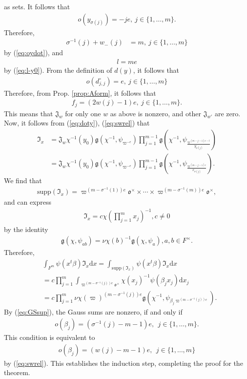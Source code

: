 \documentclass[11pt]{amsart}
\newcommand\s{\sigma}%
\newcommand\Vp{\varpi}%
\newcommand\vp{\varphi}%
\newcommand\oo{\mathfrak{o}}
\newcommand\If{\mathfrak{I}}
\newcommand\Jf{\mathfrak{J}}
\newcommand\gf{\mathfrak{g}}
\newcommand\dr{\mathrm{d}}
\newcommand\1{\mathbf{1}}
\newcommand\tm{\times}
\newcommand\supp{{\mathrm{supp}}}%
\numberwithin{equation}{section}
\begin{document}
as sets.
It follows that 
\begin{align*}
o(y_{\s(j)}) = -je, \ j \in \{1, \ldots, m\}.
\end{align*} 
Therefore,  
\begin{align}
\s^{-1}(j) + w_-(j) &= m, \ j \in \{1,\ldots, m\} \label{eq:swrel}
\end{align} 
by (\ref{eq:oydot}), and 
\begin{align*}
l = me
\end{align*} 
by (\ref{eq:l-y0}).
From the definition of $d(y)$, it follows that 
\begin{align*}
o(d_{j,j}^\circ) = e, \ j \in \{1,\ldots, m\}
\end{align*} 
Therefore, from Prop. \ref{prop:Aform}, it follows that  
\begin{align*}
f_j = (2w(j)-1)e, \ j \in \{1,\ldots, m\}.
\end{align*} 
This means that $\Jf_{w}$ for only one $w$ as above is nonzero, and other $\Jf_{w'}$ are zero.
Now, it follows from (\ref{eq:doty}), (\ref{eq:swrel}) that 
\begin{align*} 
\If_x &= \Jf_{w} \chi^{-1}(y_{0}) \gf(\chi^{-1}, \psi_{\Vp^{-e}}) \prod_{j=1}^{m-1} \gf\left(\chi^{-1}, \psi_{\frac{\Vp^{(m-j-1)e-l}}{y_{\s(j)}}}\right) \\
&= \Jf_{w} \chi^{-1}(y_{0}) \gf(\chi^{-1}, \psi_{\Vp^{-e}}) \prod_{j=1}^{m-1} \gf\left(\chi^{-1}, \psi_{\frac{\Vp^{(m-j-1)e}}{x_{\s(j)}}}\right).
\end{align*} 
We find that
\begin{align*}
\supp(\If_x) = \Vp^{(m-\s^{-1}(1))e} \oo^\tm \tm \cdots \tm \Vp^{(m-\s^{-1}(m))e} \oo^\tm,
\end{align*} 
and can express 
\begin{align*}
\If_x = c \chi(\prod_{j=1}^m x_j)^{-1}, c \neq 0 
\end{align*} 
by the identity
\begin{align}
\gf(\chi,\psi_{ab}) = \nu\chi(b)^{-1} \gf(\chi,\psi_{a}) ,a,b \in F^\tm. \label{eq:GSprop}
\end{align}
Therefore,  
\begin{align*}
& \int_{F^{m}} \psi(x {}^t\beta) \If_x \dr x = \int_{\supp(\If_x)} \psi(x {}^t\beta) \If_x \dr x \\
&= c\prod_{j=1}^m \int_{\Vp^{(m-\s^{-1}(j))e} \oo^\tm} \chi(x_j)^{-1} \psi(\beta_j x_j) \dr x_j \\
&= c \prod_{j =1}^m \nu\chi(\Vp)^{(m-\s^{-1}(j))e} \gf\left(\chi^{-1}, \psi_{\beta_j \Vp^{(m -\s^{-1}(j))e}}\right).
\end{align*} 
By (\ref{eq:GSsup}), the Gauss sums are nonzero, if and only if 
\begin{align*}
o(\beta_j) = (\s^{-1}(j) -m-1)e, \ \ j \in \{1,\ldots, m\}.
\end{align*} 
This condition is equivalent to 
\begin{align*}
o(\beta_j) = (w(j) -m-1)e, \ \ j \in \{1,\ldots, m\}
\end{align*} 
by (\ref{eq:swrel}).
This establishes the induction step, completing the proof for the theorem.
\end{document}
